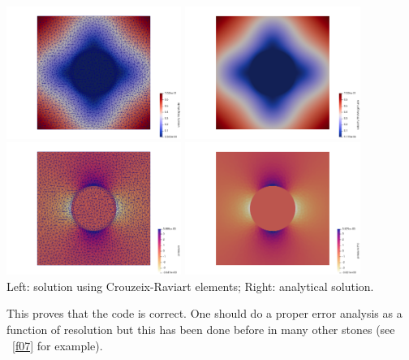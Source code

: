 \begin{center}
\includegraphics[width=5.7cm]{python_codes/fieldstone_142/results/case0/vel}
\includegraphics[width=5.7cm]{python_codes/fieldstone_142/results/case0/vel_th}\\
\includegraphics[width=5.7cm]{python_codes/fieldstone_142/results/case0/press}
\includegraphics[width=5.7cm]{python_codes/fieldstone_142/results/case0/press_th}\\
{\captionfont Left: solution using Crouzeix-Raviart elements; Right: analytical solution.}
\end{center}

This proves that the code is correct. One should do a proper error analysis as a function 
of resolution but this has been done before in many other stones (see \stone~\ref{f07} for example). 

